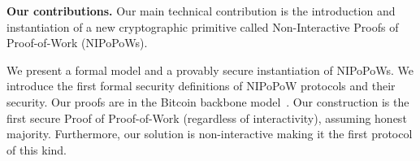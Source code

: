 %


\noindent
\textbf{Our contributions.}
Our main technical contribution is the introduction and instantiation of a new
cryptographic primitive called Non-Interactive Proofs of Proof-of-Work
(NIPoPoWs).

We present a formal model and a provably secure instantiation of NIPoPoWs. We
introduce the first formal security definitions of NIPoPoW protocols and their
security. Our proofs are in the Bitcoin backbone model~\cite{backbone}. Our
construction is the first secure Proof of Proof-of-Work (regardless of
interactivity), assuming honest majority. Furthermore, our solution is
non-interactive making it the first protocol of this kind.

